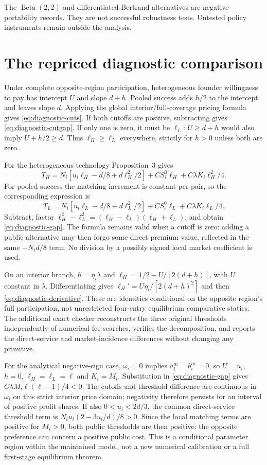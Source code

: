 \documentclass[11pt]{article}
\begin{document}
The $\operatorname{Beta}(2,2)$ and differentiated-Bertrand alternatives are negative portability records.
They are not successful robustness tests.
Untested policy instruments remain outside the analysis.

\clearpage
\section{The repriced diagnostic comparison}\label{app:diagnostic-proof}
Under complete opposite-region participation, heterogeneous founder willingness to pay has intercept $U$ and slope $d+h$.
Pooled success adds $h/2$ to the intercept and leaves slope $d$.
Applying the global interior/full-coverage pricing formula gives \eqref{eq:diagnostic-cuts}.
If both cutoffs are positive, subtracting gives \eqref{eq:diagnostic-cutgap}.
If only one is zero, it must be $\ell_L$: $U\geq d+h$ would also imply $U+h/2\geq d$.
Thus $\ell_H\geq\ell_L$ everywhere, strictly for $h>0$ unless both are zero.

For the heterogeneous technology Proposition~3 gives
\[
 T_H=N_i[u_i\ell_H-d/8+d\ell_H^2/2]+CS_i^0\ell_H
       +C\lambda K_i\ell_H^2/4.
\]
For pooled success the matching increment is constant per pair, so the corresponding expression is
\[
 T_L=N_i[u_i\ell_L-d/8+d\ell_L^2/2]+CS_i^0\ell_L
       +C\lambda K_i\ell_L/4.
\]
Subtract, factor $\ell_H^2-\ell_L^2=(\ell_H-\ell_L)(\ell_H+\ell_L)$, and obtain \eqref{eq:diagnostic-gap}.
The formula remains valid when a cutoff is zero: adding a public alternative may then forgo some direct premium value, reflected in the same $-N_id/8$ term.
No division by a possibly signed local market coefficient is used.

On an interior branch, $h=\eta_i\lambda$ and $\ell_H=1/2-U/[2(d+h)]$, with $U$ constant in $\lambda$.
Differentiating gives $\ell_H'=U\eta_i/[2(d+h)^2]$ and then \eqref{eq:diagnostic-derivative}.
These are identities conditional on the opposite region's full participation, not unrestricted four-entry equilibrium comparative statics.
The additional exact checker reconstructs the three original thresholds independently of numerical fee searches, verifies the decomposition, and reports the direct-service and market-incidence differences without changing any primitive.

For the analytical negative-sign case, $\omega_i=0$ implies $a_i^m=b_i^m=0$, so $U=u_i$, $h=0$, $\ell_H=\ell_L=\ell$ and $K_i=M_i$.
Substitution in \eqref{eq:diagnostic-gap} gives $C\lambda M_i\ell(\ell-1)/4<0$.
The cutoffs and threshold difference are continuous in $\omega_i$ on this strict interior price domain; negativity therefore persists for an interval of positive profit shares.
If also $0<u_i<2d/3$, the common direct-service threshold term is $N_i u_i(2-3u_i/d)/8>0$.
Since the local matching terms are positive for $M_i>0$, both public thresholds are then positive: the opposite preference can concern a positive public cost.
This is a conditional parameter region within the maintained model, not a new numerical calibration or a full first-stage equilibrium theorem.
\end{document}
